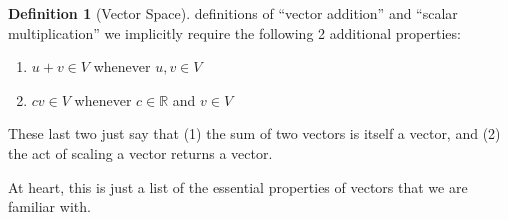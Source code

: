 \documentclass[10pt]{article}
\theoremstyle{definition}
\newtheorem{definition}[theorem]{Definition}
\newcommand{\R}{\mathbb{R}}           %
\begin{document}
\begin{definition}[Vector Space]
  definitions of ``vector addition'' and ``scalar multiplication'' we
  implicitly require the following 2 additional properties:
  \begin{enumerate}
    \item $u+v\in V$ whenever $u,v\in V$ 
    \item $cv\in V$ whenever $c\in \R$ and $v\in V$ 
  \end{enumerate}
  These last two just say that (1) the sum of two vectors is itself a vector,
  and (2) the act of scaling a vector returns a vector.
\end{definition}


At heart, this is just a list of the essential properties of vectors that we
are familiar with.
\end{document}
